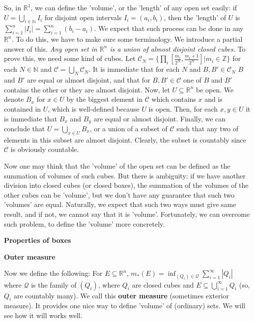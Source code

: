 \documentclass{article}
\newcommand{\NaN}{\mathbb{N}}
\newcommand{\InZ}{\mathbb{Z}}
\newcommand{\ReR}{\mathbb{R}}
\begin{document}
So, in $\ReR^1$, we can define the 'volume', or the 'length' of any open set easily: if $U = \bigcup_{i \in \NaN} I_i$ for disjoint open intervals $I_i = (a_i, b_i)$, then the 'length' of $U$ is $\sum_{i = 1}^n |I_i| = \sum_{i = 1}^n (b_i - a_i)$.
We expect that such process can be done in any $\ReR^n$.
To do this, we have to make sure some terminology.
We introduce a partial answer of this.
\textit{Any open set in $\ReR^n$ is a union of almost disjoint closed cubes.}
To prove this, we need some kind of cubes.
Let $\mathcal{C}_N = \{ \prod_i \left[ \frac{m_i}{2^N}, \frac{m_i + 1}{2^N} \right] | m_i \in \InZ \}$ for each $N \in \NaN$ and $\mathcal{C} = \bigcup_N \mathcal{C}_N$.
It is immediate that for each $N$ and $B, B' \in \mathcal{C}_N$ $B$ and $B'$ are equal or almost disjoint, and that for $B, B' \in \mathcal{C}$ one of $B$ and $B'$ contains the other or they are almost disjoint.
Now, let $U \subseteq \ReR^n$ be open.
We denote $B_x$ for $x \in U$ by the biggest element in $\mathcal{C}$ which contains $x$ and is contained in $U$, which is well-defined because $U$ is open.
Then, for each $x, y \in U$ it is immediate that $B_x$ and $B_y$ are equal or almost disjoint.
Finally, we can conclude that $U = \bigcup_{x \in U} B_x$, or a union of a subset of $\mathcal{C}$ such that any two of elements in this subset are almost disjoint.
Clearly, the subset is countably since $\mathcal{C}$ is obviously countable.

Now one may think that the 'volume' of the open set can be defined as the summation of volumes of such cubes.
But there is ambiguity: if we have another division into closed cubes (or closed boxes), the summation of the volumes of the other cubes can be 'volume', but we don't have any guarantee that such two 'volumes' are equal.
Naturally, we expect that such two ways must give same result, and if not, we cannot say that it is 'volume'.
Fortunately, we can overcome such problem, to define the 'volume' more concretely.

\newpage

\textbf{Properties of boxes}



\newpage

\textbf{Outer measure}

Now we define the following: For $E \subseteq \ReR^n$, $m_*(E) = \inf_{(Q_i) \in \mathcal{Q}} \sum_{i = 1}^\infty |Q_i|$ where $\mathcal{Q}$ is the family of $(Q_i)$, where $Q_i$ are closed cubes and $E \subseteq \bigcup_{i = 1}^\infty Q_i$ (so, $Q_i$ are countably many).
We call this \textbf{outer measure} (sometimes exterior measure).
It provides one nice way to define 'volume' of (ordinary) sets.
We will see how it will works well.
\end{document}
